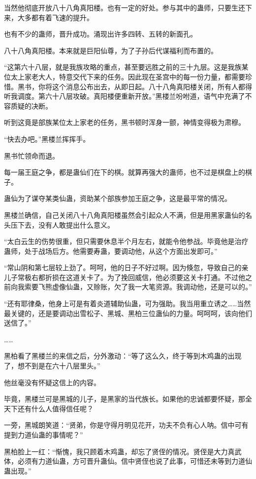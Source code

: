 \begin{this_body}
当然他彻底开放八十八角真阳楼。也有一定的好处。参与其中的蛊师，只要生还下来，大多都有着飞速的提升。

也有不少的蛊师，晋升成功。涌现出许多四转、五转的新面孔。

八十八角真阳楼。本来就是巨阳仙尊，为了子孙后代谋福利而布置的。

“这第六十八层，就是我族攻略的重点，甚至要远胜之前的三十九层。这是我族某位太上家老大人，特意交代下来的任务。因此现在圣宫中的每一份力量，都需要珍惜。黑书，你将这个消息公布出去，从即日起。八十八角真阳楼关闭，所有人都得听我调度。第六十八层攻破。真阳楼便重新开放。”黑楼兰吩咐道，语气中充满了不容质疑的决断。

听到这竟是部族某位太上家老的任务，黑书顿时浑身一颤，神情变得极为肃穆。

“快去办吧。”黑楼兰挥挥手。

黑书忙领命而退。

每一届王庭之争，都是蛊仙们在下的棋。就算再强大的蛊师，也不过是棋盘上的棋子。

蛊仙为了谋夺某类仙蛊，资助某个部族参加王庭之争，这是最平常的情况。

黑楼兰确信，自己关闭八十八角真阳楼虽然会引起众人不满，但是用黑家蛊仙的名头压下去，没有人敢提出什么意义。

“太白云生的伤势很重，但只需要休息半个月左右，就能令他参战。毕竟他是治疗蛊师，处于战场后方。他需要寿蛊，要调动他，从这个方面出发即可。”

“常山阴和第七层较上劲了。呵呵，他的日子不好过啊。因为倏忽，导致自己的亲儿子常极右都折损在这道关卡了。为了挽回威信，他必须要这关卡打通。不过他之前向我索要飞熊虚像仙蛊，又赊账，欠了我一大笔资源。我调动他，还是可以的。”

“还有耶律桑，他身上可是有着炎道辅助仙蛊，可为强助。我当用重立诱之……当然最关键的，还是要调动出雪松子、黑城、黑柏三位蛊仙的力量。呵呵呵，该向他们送信了。”

……

黑柏看了黑楼兰的来信之后，分外激动：“等了这么久，终于等到木鸡蛊的出现了，想不到是在六十八层里头。”

他丝毫没有怀疑这信上的内容。

毕竟，黑楼兰可是黑城的儿子，是黑家的当代族长。如果他的忠诚都要怀疑，那全天下还有什么人值得信任呢？

一旁，黑城朗笑道：“贤弟，你是守得月明见花开，功夫不负有心人呐。信中可有提到力道仙蛊的事情呢？”

黑柏脸上一红：“惭愧，我只顾着木鸡蛊，却忘了贤侄的情况。贤侄是大力真武体，必须有力道仙蛊，方可晋升蛊仙。信中贤侄也说了此事，可惜还未等到力道仙蛊出现。”


\end{this_body}

